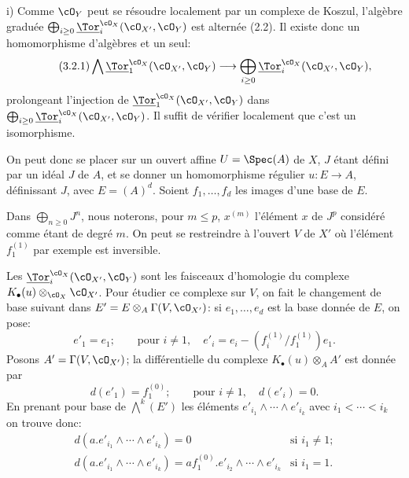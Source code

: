 i)
Comme \(\cO_Y\) peut se résoudre localement par un complexe de Koszul, l'algèbre graduée \(\bigoplus_{i\ge0}\underline{\Tor}_i^{\cO_X}(\cO_{X'},\cO_Y)\) est alternée (2.2). Il existe donc un homomorphisme d'algèbres et un seul:
\begin{equation}\tag{3.2.1}
\bigwedge \underline{\Tor}_1^{\cO_X}(\cO_{X'},\cO_Y)
\longrightarrow
\bigoplus_{i\ge0}\underline{\Tor}_i^{\cO_X}(\cO_{X'},\cO_Y),
\end{equation}
prolongeant l'injection de \(\underline{\Tor}_1^{\cO_X}(\cO_{X'},\cO_Y)\) dans
\(\bigoplus_{i\ge0}\underline{\Tor}_i^{\cO_X}(\cO_{X'},\cO_Y)\). Il suffit de vérifier localement que c'est un isomorphisme.

On peut donc se placer sur un ouvert affine \(U=\Spec(A)\) de \(X\), \(J\) étant défini par un idéal \(J\) de \(A\), et se donner un homomorphisme régulier \(u:E\to A\), définissant \(J\), avec \(E=(A)^d\). Soient \(f_1,\ldots,f_d\) les images d'une base de \(E\).

Dans \(\bigoplus_{n\ge0}J^n\), nous noterons, pour \(m\le p\), \(x^{(m)}\) l'élément \(x\) de \(J^p\) considéré comme étant de degré \(m\). On peut se restreindre à l'ouvert \(V\) de \(X'\) où l'élément \(f_1^{(1)}\) par exemple est inversible.

Les \(\underline{\Tor}_i^{\cO_X}(\cO_{X'},\cO_Y)\) sont les faisceaux d'homologie du complexe \(K_\bullet(u)\otimes_{\cO_X}\cO_{X'}\). Pour étudier ce complexe sur \(V\), on fait le changement de base suivant dans \(E'=E\otimes_A\Gamma(V,\cO_{X'})\): si \(e_1,\ldots,e_d\) est la base donnée de \(E\), on pose:
\[
e'_1=e_1;\qquad \text{pour }i\ne1,\quad
e'_i=e_i-(f_i^{(1)}/f_1^{(1)})e_1.
\]
Posons \(A'=\Gamma(V,\cO_{X'})\); la différentielle du complexe \(K_\bullet(u)\otimes_A A'\) est donnée par
\[
d(e'_1)=f_1^{(0)};\qquad \text{pour }i\ne1,\quad d(e'_i)=0.
\]
En prenant pour base de \(\bigwedge^k(E')\) les éléments
\(e'_{i_1}\wedge\cdots\wedge e'_{i_k}\) avec \(i_1<\cdots<i_k\) on trouve donc:
\[
\begin{array}{ll}
d(a.e'_{i_1}\wedge\cdots\wedge e'_{i_k})=0
&\text{si }i_1\ne1;\\[3pt]
d(a.e'_{i_1}\wedge\cdots\wedge e'_{i_k})=
af_1^{(0)}.e'_{i_2}\wedge\cdots\wedge e'_{i_k}
&\text{si }i_1=1.
\end{array}
\]
